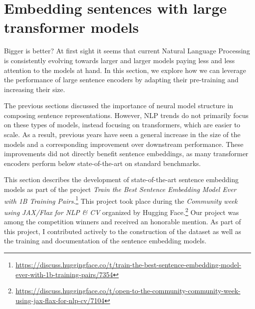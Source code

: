 \setchapterpreamble[u]{\margintoc}
\chapter{Embedding sentences with large transformer models}



Bigger is better? At first sight it seems that current Natural Language Processing is consistently evolving towards larger and larger models paying less and less attention to the models at hand. In this section, we explore how we can leverage the performance of large sentence encoders by adapting their pre-training and increasing their size.

The previous sections discussed the importance of neural model structure in composing sentence representations. However, NLP trends do not primarily focus on these types of models, instead focusing on transformers, which are easier to scale. As a result, previous years have seen a general increase in the size of the models and a corresponding improvement over downstream performance. These improvements did not directly benefit sentence embeddings, as many transformer encoders perform below state-of-the-art on standard benchmarks. 

This section describes the development of state-of-the-art sentence embedding models as part of the project \textit{Train the Best Sentence Embedding Model Ever with 1B Training Pairs}.\footnote{\url{https://discuss.huggingface.co/t/train-the-best-sentence-embedding-model-ever-with-1b-training-pairs/7354}} This project took place during the \textit{Community week using JAX/Flax for NLP \& CV} organized by Hugging Face.\footnote{\url{https://discuss.huggingface.co/t/open-to-the-community-community-week-using-jax-flax-for-nlp-cv/7104}} Our project was among the competition winners and received an honorable mention. As part of this project, I contributed actively to the construction of the dataset as well as the training and documentation of the sentence embedding models.

